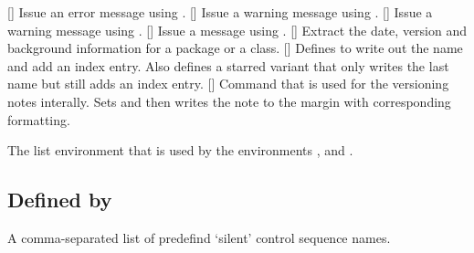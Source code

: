 \documentclass[load-preamble]{cnltx-doc}
\makeatletter
\def\cnltxcsnames{\cnltx@package@name@format{cnltx-csnames}}
\makeatother
\begin{document}
\begin{commands}
  []
    Issue an error message using .
  []
    Issue a warning message using .
    []
    Issue a warning message using .
  []
    Issue a message using .
  []
    Extract the date, version and background information for a package or a
    class.
  []
    Defines  to write out the name and add an index entry.  Also
    defines a starred variant that only writes the last name but still adds an
    index entry.
  []
    Command that is used for the versioning notes interally.  Sets
     and then writes the note  to the margin
    with corresponding formatting.
\end{commands}
\begin{environments}
    The list environment that is used by the environments ,
     and .
\end{environments}

\subsection{Defined by \cnltxcsnames}

\begin{commands}
    A comma-separated list of predefind `silent' control sequence names.
\end{commands}

\printindex
\end{document}
